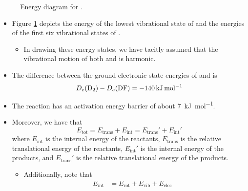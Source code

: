 \documentclass[../notes.tex]{subfiles}
\begin{document}
\begin{itemize}
\begin{figure}[h!]
        \caption{Energy diagram for .}
        \label{fig:FD2}
    \end{figure}
    \begin{itemize}
        \item Figure \ref{fig:FD2} depicts the energy of the lowest vibrational state of  and the energies of the first six vibrational states of .
        \begin{itemize}
            \item In drawing these energy states, we have tacitly assumed that the vibrational motion of both  and  is harmonic.
        \end{itemize}
        \item The difference between the ground electronic state energies of  and  is
        \begin{equation*}
            D_e(\ce{D2})-D_e(\ce{DF}) = -\SI{140}{\kilo\joule\per\mole}
        \end{equation*}
        \item The reaction has an activation energy barrier of about \SI{7}{\kilo\joule\per\mole}.
        \item Moreover, we have that
        \begin{equation*}
            E_\text{tot} = E_\text{trans}+E_\text{int}
            = E_\text{trans}'+E_\text{int}'
        \end{equation*}
        where $E_\text{int}$ is the internal energy of the reactants, $E_\text{trans}$ is the relative translational energy of the reactants, $E_\text{int}'$ is the internal energy of the products, and $E_\text{trans}'$ is the relative translational energy of the products.
        \begin{itemize}
            \item Additionally, note that
            \begin{align*}
                E_\text{int} &= E_\text{rot}+E_\text{vib}+E_\text{elec}&

\end{align*}
\end{itemize}
\end{itemize}
\end{itemize}
\end{document}
